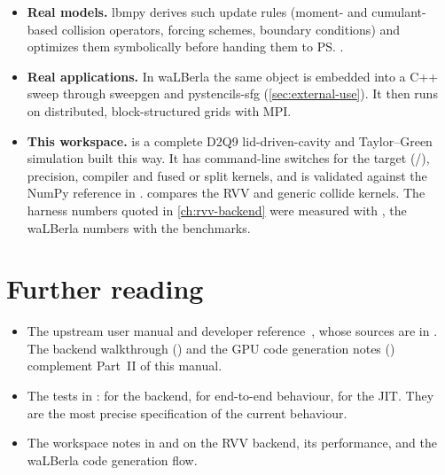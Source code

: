 \begin{itemize}
  \item \textbf{Real models.} lbmpy derives such update rules (moment- and
        cumulant-based collision operators, forcing schemes, boundary conditions) and
        optimizes them symbolically before handing them to \ps.
  \item \textbf{Real applications.} In waLBerla the same  object is
        embedded into a C++ sweep through sweepgen and pystencils-sfg
        (\cref{sec:external-use}). It then runs on distributed, block-structured grids
        with MPI.
  \item \textbf{This workspace.}  is a
        complete D2Q9 lid-driven-cavity and Taylor--Green simulation built this way.
        It has command-line switches for the target (/),
        precision, compiler and fused or split kernels, and is validated against the
        NumPy reference in .
         compares the RVV and generic collide kernels.
        The harness numbers quoted in \cref{ch:rvv-backend} were measured with
        , the waLBerla numbers with the
         benchmarks.
\end{itemize}

\section{Further reading}
\begin{itemize}
  \item The upstream user manual and developer reference~\cite{pystencils-docs}, whose
        sources are in . The backend walkthrough
        () and the GPU code generation notes
        () complement Part~II of this manual.
  \item The tests in :  for the
        backend,  for end-to-end behaviour,  for the
        JIT. They are the most precise specification of the current behaviour.
  \item The workspace notes in  and  on the RVV
        backend, its performance, and the waLBerla code generation flow.
\end{itemize}
